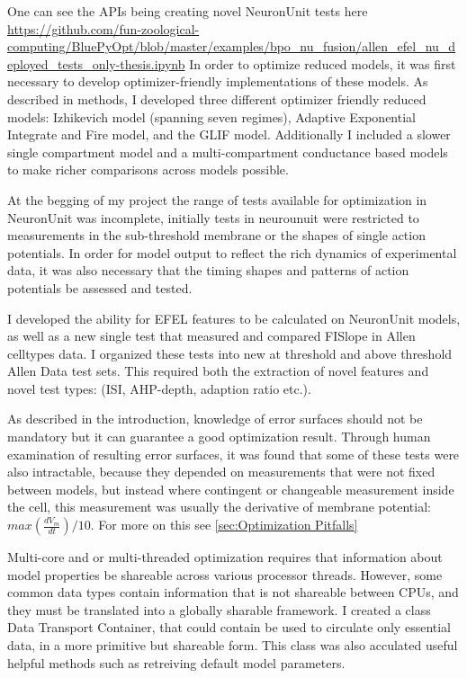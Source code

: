 One can see the APIs being creating novel NeuronUnit tests here \url{https://github.com/fun-zoological-computing/BluePyOpt/blob/master/examples/bpo_nu_fusion/allen_efel_nu_deployed_tests_only-thesis.ipynb}
In order to optimize reduced models, it was first necessary to develop optimizer-friendly implementations of these models. As described in methods, I developed three different optimizer friendly reduced models: Izhikevich model (spanning seven regimes), Adaptive Exponential Integrate and Fire model, and the GLIF model. Additionally I included a slower single compartment model and a multi-compartment conductance based models to make richer comparisons across models possible.

At the begging of my project the range of tests available for optimization in NeuronUnit was incomplete, initially tests in neurounuit were restricted to measurements in the sub-threshold membrane or the shapes of single action potentials. In order for model output to reflect the rich dynamics of experimental data, it was also necessary that the timing shapes and patterns of action potentials be assessed and tested. 

I developed the ability for EFEL features to be calculated on NeuronUnit models, as well as a new single test that measured and compared FISlope in Allen celltypes data. I organized these tests into new at threshold and above threshold Allen Data test sets. This required both the extraction of novel features and novel test types: (ISI, AHP-depth, adaption ratio etc.).  

As described in the introduction, knowledge of error surfaces should not be mandatory but it can guarantee a good optimization result. Through human examination of resulting error surfaces, it was found that some of these tests were also intractable, because they depended on measurements that were not fixed between models, but instead where contingent or changeable measurement inside the cell, this measurement was usually the derivative of membrane potential: $max(\frac{dV_{m}}{dt})/10$. For more on this see \ref{sec:Optimization Pitfalls}

Multi-core and or multi-threaded optimization requires that information about model properties be shareable across various processor threads. However, some common data types contain information that is not shareable between CPUs, and they must be translated into a globally sharable framework. I created a class Data Transport Container, that could contain be used to circulate only essential data, in a more primitive but shareable form. This class was also acculated useful helpful methods such as retreiving default model parameters.

